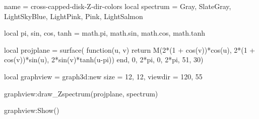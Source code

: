 \documentclass{standalone}
\begin{document}
\begin{luadraw}{name = cross-capped-disk-Z-dir-colors}
local spectrum = {Gray, SlateGray, LightSkyBlue, LightPink, Pink, LightSalmon}

local pi, sin, cos, tanh = math.pi, math.sin, math.cos, math.tanh

local projplane = surface(
  function(u, v)
    return M(2*(1 + cos(v))*cos(u), 2*(1 + cos(v))*sin(u), 2*sin(v)*tanh(u-pi))
  end,
  0, 2*pi, 0,  2*pi,
  {51, 30})

local graphview = graph3d:new{
  size    = {12, 12},
  viewdir = {120, 55}
}

graphview:draw_Zspectrum(projplane, spectrum)

graphview:Show()
\end{luadraw}
\end{document}
